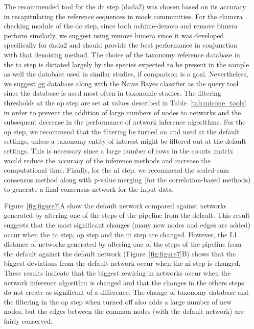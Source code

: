   The recommended tool for the \ac{dc} step (\ac{dada2}) was chosen based on its accuracy in recapitulating the reference sequences in mock communities.
  For the chimera checking module of the \ac{dc} step, since both uchime-denovo and remove bimera perform similarly, we suggest using remove bimera since it was developed specifically for \ac{dada2} and should provide the best performance in conjunction with that denoising method.
  The choice of the taxonomy reference database in the \ac{ta} step is dictated largely by the species expected to be present in the sample as well the database used in similar studies, if comparison is a goal.
  Nevertheless, we suggest \ac{gg} database along with the Naive Bayes classifier as the query tool since the database is used most often in taxonomic studies.
  The filtering thresholds at the \ac{op} step are set at values described in Table~\ref{tab:micone_tools} in order to prevent the addition of large numbers of nodes to networks and the subsequent decrease in the performance of network inference algorithms.
  For the \ac{op} step, we recommend that the filtering be turned on and used at the default settings, unless a taxonomy entity of interest might be filtered out at the default settings.
  This is necessary since a large number of rows in the counts matrix would reduce the accuracy of the inference methods and increase the computational time.
  Finally, for the \ac{ni} step, we recommend the scaled-sum consensus method along with p-value merging (for the correlation-based methods) to generate a final consensus network for the input data.

  Figure~\ref{fig:figure7}A show the default network compared against networks generated by altering one of the steps of the pipeline from the default.
  This result suggests that the most significant changes (many new nodes and edges are added) occur when the \ac{ta} step, \ac{op} step and the \ac{ni} step are changed.
  However, the L1 distance of networks generated by altering one of the steps of the pipeline from the default against the default network (Figure~\ref{fig:figure7}B) shows that the biggest deviations from the default network occur when the \ac{ni} step is changed.
  These results indicate that the biggest rewiring in networks occur when the network inference algorithm is changed and that the changes in the others steps do not create as significant of a difference.
  The change of taxonomy database and the filtering in the \ac{op} step when turned off also adds a large number of new nodes, but the edges between the common nodes (with the default network) are fairly conserved.

